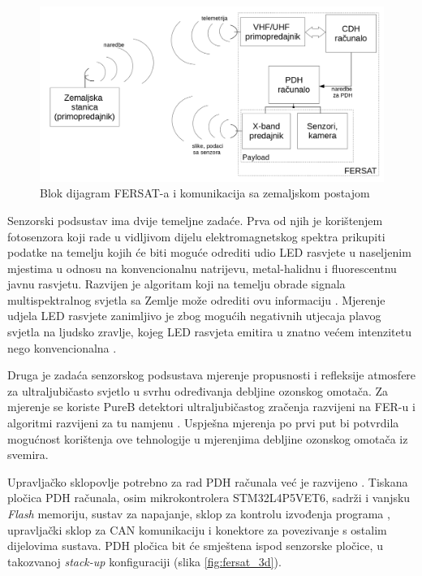     \begin{figure}[htb]
        \centering
        \includegraphics[width=\textwidth]{slike/fersat_blok_dijagram.png}
        \caption{Blok dijagram FERSAT-a i komunikacija sa zemaljskom postajom \cite{diplomski_goran_petrak}}
        \label{fig:fersat_blok}
    \end{figure}

    Senzorski podsustav ima dvije temeljne zadaće. Prva od njih je korištenjem fotosenzora koji rade u vidljivom dijelu elektromagnetskog spektra prikupiti podatke na temelju kojih će biti moguće odrediti udio LED rasvjete u naseljenim mjestima u odnosu na konvencionalnu natrijevu, metal-halidnu i fluorescentnu javnu rasvjetu. Razvijen je algoritam koji na temelju obrade signala multispektralnog svjetla sa Zemlje može odrediti ovu informaciju \cite{diplomski_jakov_tutavac}. Mjerenje udjela LED rasvjete zanimljivo je zbog mogućih negativnih utjecaja plavog svjetla na ljudsko zravlje, kojeg LED rasvjeta emitira u znatno većem intenzitetu nego konvencionalna \cite{falchi_light_pollution}.

    Druga je zadaća senzorskog podsustava mjerenje propusnosti i refleksije atmosfere za ultraljubičasto svjetlo u svrhu određivanja debljine ozonskog omotača. Za mjerenje se koriste PureB detektori ultraljubičastog zračenja razvijeni na FER-u \cite{diplomski_filip_bogdanovic} i algoritmi razvijeni za tu namjenu \cite{zavrsni_kristian_stepancic}. Uspješna mjerenja po prvi put bi potvrdila mogućnost korištenja ove tehnologije u mjerenjima debljine ozonskog omotača iz svemira.

    Upravljačko sklopovlje potrebno za rad PDH računala već je razvijeno \cite{zavrsni_filip_juric}. Tiskana pločica PDH računala, osim mikrokontrolera STM32L4P5VET6, sadrži i vanjsku \textit{Flash} memoriju, sustav za napajanje, sklop za kontrolu izvođenja programa , upravljački sklop za CAN komunikaciju i konektore za povezivanje s ostalim dijelovima sustava. PDH pločica bit će smještena ispod senzorske pločice, u takozvanoj \textit{stack-up} konfiguraciji (slika \ref{fig:fersat_3d}).

